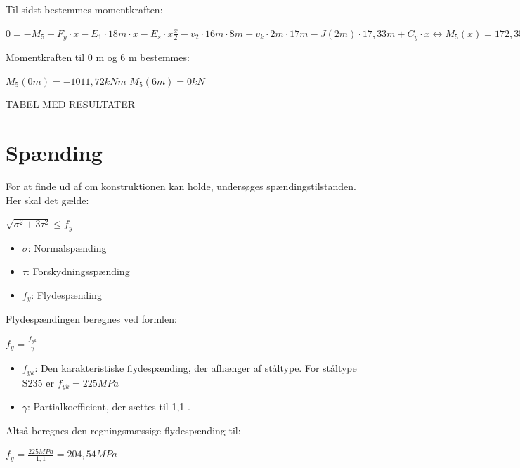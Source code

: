 Til sidst bestemmes momentkraften:
\begin{center}
	$0 = -M_5 - F_y \cdot x - E_1 \cdot 18 m \cdot x - E_s \cdot x \frac{x}{2} - v_2 \cdot 16 m \cdot 8 m - v_k \cdot 2 m \cdot 17 m - J(2m) \cdot 17,\!33 m + C_y \cdot x \leftrightarrow M_5(x) = 172,\!35 kN \cdot x - 0,\!62 \frac{kN}{m} \cdot x^2 -1011,\!72 kNm$
\end{center}

Momentkraften til 0 m og 6 m bestemmes:
\begin{center}
	$M_5(0m) = -1011,\!72 kNm$
	\newline
	$M_5(6m) = 0 kN$
\end{center}


TABEL MED RESULTATER

\section{Spænding}
For at finde ud af om konstruktionen kan holde, undersøges spændingstilstanden. Her skal det gælde:

\begin{center}
	$\sqrt{\sigma^2 + 3\tau^2} \le f_y$ 
\end{center}

\begin{itemize}
	\item[-] $\sigma$: Normalspænding
	\item[-] $\tau$: Forskydningsspænding
	\item[-] $f_y$: Flydespænding
\end{itemize}

Flydespændingen beregnes ved formlen:

\begin{center}
	$f_y = \frac{f_{yk}}{\gamma}$
\end{center}

\begin{itemize}
	\item[-] $f_{yk}$: Den karakteristiske flydespænding, der afhænger af ståltype. For ståltype S235 er $f_{yk} = 225 MPa$
	\item[-] $\gamma$: Partialkoefficient, der sættes til 1,1 \citep[ s. 212]{stabi}.  
\end{itemize}

Altså beregnes den regningsmæssige flydespænding til:

\begin{center}
	$f_y = \frac{225 MPa}{1,\!1} = 204,\!54 MPa$
\end{center}

